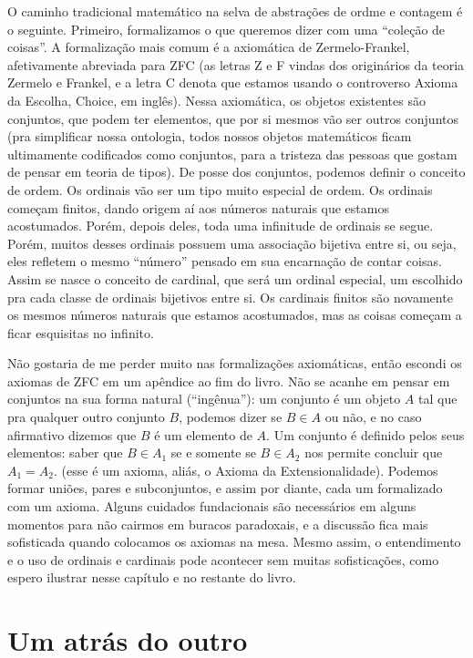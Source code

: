 \documentclass[11pt]{article}
\theoremstyle{definition}
\theoremstyle{definition}
\theoremstyle{definition}
\theoremstyle{definition}
\theoremstyle{definition}
\theoremstyle{definition}
\theoremstyle{definition}
\theoremstyle{definition}
\theoremstyle{definition}
\theoremstyle{definition}
\theoremstyle{definition}
\theoremstyle{definition}
\theoremstyle{definition}
\begin{document}
O caminho tradicional matemático na selva de abstrações de ordme e contagem é o seguinte. Primeiro, formalizamos o que queremos dizer com uma ``coleção de coisas''. A formalização mais comum é a axiomática de Zermelo-Frankel, afetivamente abreviada para ZFC (as letras Z e F vindas dos originários da teoria Zermelo e Frankel, e a letra C denota que estamos usando o controverso Axioma da Escolha, Choice, em inglês). Nessa axiomática, os objetos existentes são conjuntos, que podem ter elementos, que por si mesmos vão ser outros conjuntos (pra simplificar nossa ontologia, todos nossos objetos matemáticos ficam ultimamente codificados como conjuntos, para a tristeza das pessoas que gostam de pensar em teoria de tipos). De posse dos conjuntos, podemos definir o conceito de ordem. Os ordinais vão ser um tipo muito especial de ordem. Os ordinais começam finitos, dando origem aí aos números naturais que estamos acostumados. Porém, depois deles, toda uma infinitude de ordinais se segue. Porém, muitos desses ordinais possuem uma associação bijetiva entre si, ou seja, eles refletem o mesmo ``número'' pensado em sua encarnação de contar coisas. Assim se nasce o conceito de cardinal, que será um ordinal especial, um escolhido pra cada classe de ordinais bijetivos entre si. Os cardinais finitos são novamente os mesmos números naturais que estamos acostumados, mas as coisas começam a ficar esquisitas no infinito.

Não gostaria de me perder muito nas formalizações axiomáticas, então escondi os axiomas de ZFC em um apêndice ao fim do livro. Não se acanhe em pensar em conjuntos na sua forma natural (``ingênua''): um conjunto é um objeto $A$ tal que pra qualquer outro conjunto $B$, podemos dizer se $B \in A$ ou não, e no caso afirmativo dizemos que $B$ é um elemento de $A$. Um conjunto é definido pelos seus elementos: saber que $B \in A_1$ se e somente se $B \in A_2$ nos permite concluir que $A_1 = A_2$. (esse é um axioma, aliás, o Axioma da Extensionalidade). Podemos formar uniões, pares e subconjuntos, e assim por diante, cada um formalizado com um axioma. Alguns cuidados fundacionais são necessários em alguns momentos para não cairmos em buracos paradoxais, e a discussão fica mais sofisticada quando colocamos os axiomas na mesa. Mesmo assim, o entendimento e o uso de ordinais e cardinais pode acontecer sem muitas sofisticações, como espero ilustrar nesse capítulo e no restante do livro.

\section{Um atrás do outro}
\end{document}
